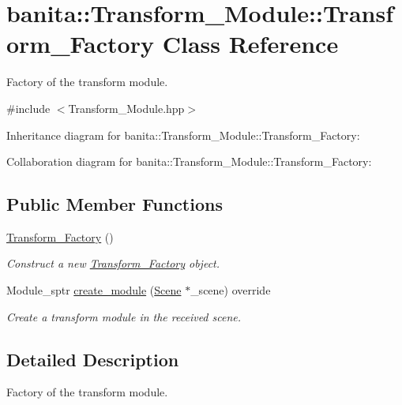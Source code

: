 \hypertarget{classbanita_1_1_transform___module_1_1_transform___factory}{}\section{banita\+::Transform\+\_\+\+Module\+::Transform\+\_\+\+Factory Class Reference}
\label{classbanita_1_1_transform___module_1_1_transform___factory}


Factory of the transform module.  




{\ttfamily \#include $<$Transform\+\_\+\+Module.\+hpp$>$}



Inheritance diagram for banita\+::Transform\+\_\+\+Module\+::Transform\+\_\+\+Factory\+:


Collaboration diagram for banita\+::Transform\+\_\+\+Module\+::Transform\+\_\+\+Factory\+:
\subsection*{Public Member Functions}
\begin{DoxyCompactItemize}
\item 
\mbox{\hyperlink{classbanita_1_1_transform___module_1_1_transform___factory_a030c569c27df0cf90faf7b87450c70fc}{Transform\+\_\+\+Factory}} ()
\begin{DoxyCompactList}\small\item\em Construct a new \mbox{\hyperlink{classbanita_1_1_transform___module_1_1_transform___factory}{Transform\+\_\+\+Factory}} object. \end{DoxyCompactList}\item 
Module\+\_\+sptr \mbox{\hyperlink{classbanita_1_1_transform___module_1_1_transform___factory_af7dee8a255d901ad4190757ee9c68728}{create\+\_\+module}} (\mbox{\hyperlink{classbanita_1_1_scene}{Scene}} $\ast$\+\_\+scene) override
\begin{DoxyCompactList}\small\item\em Create a transform module in the received scene. \end{DoxyCompactList}\end{DoxyCompactItemize}


\subsection{Detailed Description}
Factory of the transform module. 



